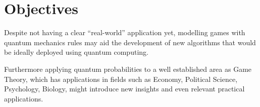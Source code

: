 \section{Objectives}
\label{sec:int_objectives}

Despite not having a clear ``real-world'' application yet, modelling games with quantum mechanics rules may aid the development of new algorithms that would be ideally deployed using quantum computing. 

Furthermore applying quantum probabilities to a well established area as Game Theory, which has applications in fields such as Economy, Political Science, Psychology, Biology, might introduce new insights and even relevant practical applications\cite{Eisert2008}. 